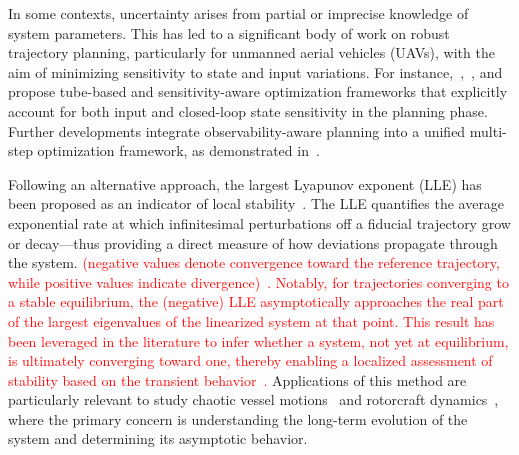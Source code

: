 In some contexts, uncertainty arises from partial or imprecise knowledge of system parameters. This has led to a significant body of work on robust trajectory planning, particularly for unmanned aerial vehicles (UAVs), with the aim of minimizing sensitivity to state and input variations. For instance,~\cite{Brault:RobustTrajectoryPlanning:2021},~\cite{Giordano:TrajectoryGenerationMinimum:2018}, and~\cite{Brault:TubebasedTrajectoryOptimization:} propose tube-based and sensitivity-aware optimization frameworks that explicitly account for both input and closed-loop state sensitivity in the planning phase. Further developments integrate observability-aware planning into a unified multi-step optimization framework, as demonstrated in~\cite{Bohm:COPControlObservabilityaware:2022}.

Following an alternative approach, the largest Lyapunov exponent (LLE) has been proposed as an indicator of local stability~\cite{Meng:AnalysisGlobalCharacteristics:2022}. The LLE quantifies the average exponential rate at which infinitesimal perturbations off a fiducial trajectory grow or decay---thus providing a direct measure of how deviations propagate through the system. 
\textcolor{red}{(negative values denote convergence toward the reference trajectory, while positive values indicate divergence)~\cite{Strogatz:NonlinearDynamicsChaos:2019}. 
Notably, for trajectories converging to a stable equilibrium, the (negative) LLE asymptotically approaches the real part of the largest eigenvalues of the linearized system at that point. This result has been leveraged in the literature to infer whether a system, not yet at equilibrium, is ultimately converging toward one, thereby enabling a localized assessment of stability based on the transient behavior~\cite{Sadri:StabilityAnalysisNonlinear:2013}.} Applications of this method are particularly relevant to study chaotic vessel motions~\cite{McCue:UseLyapunovExponents:2011} and rotorcraft dynamics~\cite{Tamer:StabilityNonlinearTimeDependent:2016,Cassoni:RotorcraftStabilityAnalysis:2024}, where the primary concern is understanding the long-term evolution of the system and determining its asymptotic behavior.
